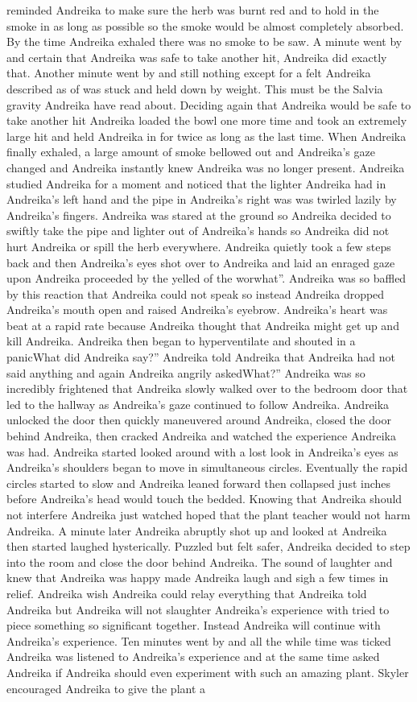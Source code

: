 \documentclass[12pt]{book}
\begin{document}
reminded Andreika to make sure the herb was burnt red and to hold in the smoke in as long as possible so the smoke would be almost completely absorbed. By the time Andreika exhaled there was no smoke to be saw. A minute went by and certain that Andreika was safe to take another hit, Andreika did exactly that. Another minute went by and still nothing except for a felt Andreika described as of was stuck and held down by weight. This must be the Salvia gravity Andreika have read about. Deciding again that Andreika would be safe to take another hit Andreika loaded the bowl one more time and took an extremely large hit and held Andreika in for twice as long as the last time. When Andreika finally exhaled, a large amount of smoke bellowed out and Andreika's gaze changed and Andreika instantly knew Andreika was no longer present. Andreika studied Andreika for a moment and noticed that the lighter Andreika had in Andreika's left hand and the pipe in Andreika's right was was twirled lazily by Andreika's fingers. Andreika was stared at the ground so Andreika decided to swiftly take the pipe and lighter out of Andreika's hands so Andreika did not hurt Andreika or spill the herb everywhere. Andreika quietly took a few steps back and then Andreika's eyes shot over to Andreika and laid an enraged gaze upon Andreika proceeded by the yelled of the worwhat''. Andreika was so baffled by this reaction that Andreika could not speak so instead Andreika dropped Andreika's mouth open and raised Andreika's eyebrow. Andreika's heart was beat at a rapid rate because Andreika thought that Andreika might get up and kill Andreika. Andreika then began to hyperventilate and shouted in a panicWhat did Andreika say?'' Andreika told Andreika that Andreika had not said anything and again Andreika angrily askedWhat?'' Andreika was so incredibly frightened that Andreika slowly walked over to the bedroom door that led to the hallway as Andreika's gaze continued to follow Andreika. Andreika unlocked the door then quickly maneuvered around Andreika, closed the door behind Andreika, then cracked Andreika and watched the experience Andreika was had. Andreika started looked around with a lost look in Andreika's eyes as Andreika's shoulders began to move in simultaneous circles. Eventually the rapid circles started to slow and Andreika leaned forward then collapsed just inches before Andreika's head would touch the bedded. Knowing that Andreika should not interfere Andreika just watched hoped that the plant teacher would not harm Andreika. A minute later Andreika abruptly shot up and looked at Andreika then started laughed hysterically. Puzzled but felt safer, Andreika decided to step into the room and close the door behind Andreika. The sound of laughter and knew that Andreika was happy made Andreika laugh and sigh a few times in relief. Andreika wish Andreika could relay everything that Andreika told Andreika but Andreika will not slaughter Andreika's experience with tried to piece something so significant together. Instead Andreika will continue with Andreika's experience. Ten minutes went by and all the while time was ticked Andreika was listened to Andreika's experience and at the same time asked Andreika if Andreika should even experiment with such an amazing plant. Skyler encouraged Andreika to give the plant a 
\end{document}
